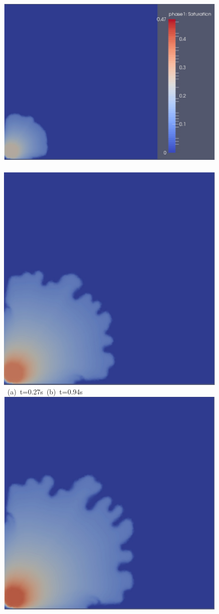 \begin{landscape}
\begin{figure}[ht] 
\vbox{\vspace{-1cm}
\hbox{\includegraphics[width=.9\textwidth, height=0.5\textwidth]{./Pics1/Saffman_homogeneous_VR150/ST_Homog_VR150_D300b.pdf}
\hspace{0.5cm}      
      \includegraphics[width=.5\textwidth]{./Pics1/Saffman_homogeneous_VR150/ST_Homog_VR150_D1600b.pdf}}
\vspace{0.cm}
\hbox{\hspace{5.cm} (a) t=0.27s \hspace{8.cm} (b) t=0.94s }
\vspace{0.5cm}
\hbox{
      \includegraphics[width=.5\textwidth]{./Pics1/Saffman_homogeneous_VR150/ST_Homog_VR150_D2700b.pdf}
}}
\end{figure}
\end{landscape}
